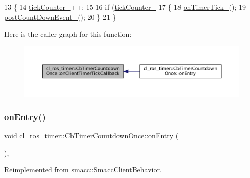 \begin{DoxyCode}
13 \{
14     \hyperlink{classcl__ros__timer_1_1CbTimerCountdownOnce_aea7372342782a0b6a1ba50b07ccb0962}{tickCounter\_}++;
15 
16     \textcolor{keywordflow}{if} (\hyperlink{classcl__ros__timer_1_1CbTimerCountdownOnce_aea7372342782a0b6a1ba50b07ccb0962}{tickCounter\_} %
17     \{
18         \hyperlink{classcl__ros__timer_1_1CbTimerCountdownOnce_ac948b5efd5c9a397319668378463eadd}{onTimerTick\_}();
19         \hyperlink{classcl__ros__timer_1_1CbTimerCountdownOnce_a5ab3b0a0aa38f28bc3091583d30fe003}{postCountDownEvent\_}();
20     \}
21 \}
\end{DoxyCode}
Here is the caller graph for this function\+:
\nopagebreak
\begin{figure}[H]
\begin{center}
\leavevmode
\includegraphics[width=350pt]{classcl__ros__timer_1_1CbTimerCountdownOnce_a2b02bbde9c9321781b70b9371b22673a_icgraph}
\end{center}
\end{figure}
\mbox{\label{classcl__ros__timer_1_1CbTimerCountdownOnce_a613662c4a4106ece0ce1dee198d1aba2}} 
\subsubsection{\texorpdfstring{on\+Entry()}{onEntry()}}
{\footnotesize\ttfamily void cl\+\_\+ros\+\_\+timer\+::\+Cb\+Timer\+Countdown\+Once\+::on\+Entry (\begin{DoxyParamCaption}{ }\end{DoxyParamCaption})\hspace{0.3cm}{\ttfamily [override]}, {\ttfamily [virtual]}}



Reimplemented from \hyperlink{classsmacc_1_1SmaccClientBehavior_ad5d3e1f1697c3cfe66c94cadba948493}{smacc\+::\+Smacc\+Client\+Behavior}.



